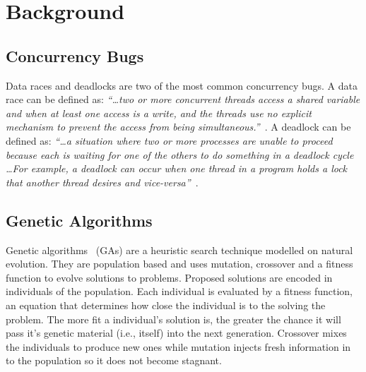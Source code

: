 \documentclass[runningheads,a4paper]{llncs}
\begin{document}
\section{Background}
\label{sec:background}

\subsection{Concurrency Bugs}
\label{sec:concurrency}

Data races and deadlocks are two of the most common concurrency bugs. A data race can be defined as: \textit{``\ldots two or more concurrent threads access a shared variable and when at least one access is a write, and the threads use no explicit mechanism to prevent the access from being simultaneous.''}~\cite{LSW07}. A deadlock can be defined as: \textit{``\ldots a situation where two or more processes are unable to proceed because each is waiting for one of the others to do something in a deadlock cycle \ldots For example, a deadlock can occur when one thread in a program holds a lock that another thread desires and vice-versa''}~\cite{LSW07}. 






\subsection{Genetic Algorithms}
\label{sec:genetic_algorithms}

Genetic algorithms~\cite{GA92} (GAs) are a heuristic search technique modelled on natural evolution.  They are population based and uses mutation, crossover and a fitness function to evolve solutions to problems. Proposed solutions are encoded in individuals of the population. Each individual is evaluated by a fitness function, an equation that determines how close the individual is to the solving the problem. The more fit a individual's solution is, the greater the chance it will pass it's genetic material (i.e., itself) into the next generation. Crossover mixes the individuals to produce new ones while mutation injects fresh information in to the population so it does not become stagnant.
\end{document}
